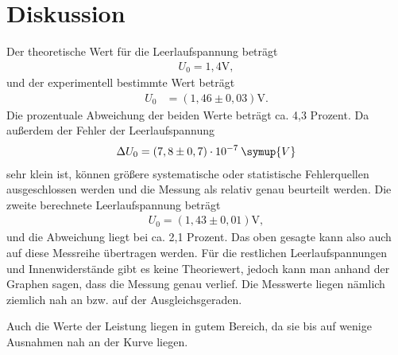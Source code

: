 \section{Diskussion}
\label{sec:Diskussion}

Der theoretische Wert für die Leerlaufspannung beträgt
\begin{align*}
U_0 = 1,4 \si{\volt} ,
\end{align*}
\noindent und der experimentell bestimmte Wert beträgt
\begin{align*}
U_0 &= (1,46 \pm 0,03)\si{\volt} .
\end{align*}
Die prozentuale Abweichung der beiden Werte beträgt ca. 4,3 Prozent.
Da außerdem der Fehler der Leerlaufspannung
\begin{align*}
\Delta U_0 = (7,8 \pm 0,7) \cdot 10^{-7} \: \symup{V} 
\end{align*}
sehr klein ist, können größere systematische oder statistische Fehlerquellen ausgeschlossen werden und die Messung als relativ genau beurteilt werden.
Die zweite berechnete Leerlaufspannung beträgt
\begin{align*}
U_0 =  (1,43 \pm 0,01)\si{\volt} ,
\end{align*}
und die Abweichung liegt bei ca. 2,1 Prozent. Das oben gesagte kann also auch auf diese Messreihe übertragen werden.
Für die restlichen Leerlaufspannungen und Innenwiderstände gibt es keine Theoriewert, jedoch kann man anhand der Graphen sagen,
dass die Messung genau verlief. Die Messwerte liegen nämlich ziemlich nah an bzw. auf der Ausgleichsgeraden.

\noindent Auch die Werte der Leistung liegen in gutem Bereich, da sie bis auf wenige Ausnahmen nah an der Kurve liegen. 





